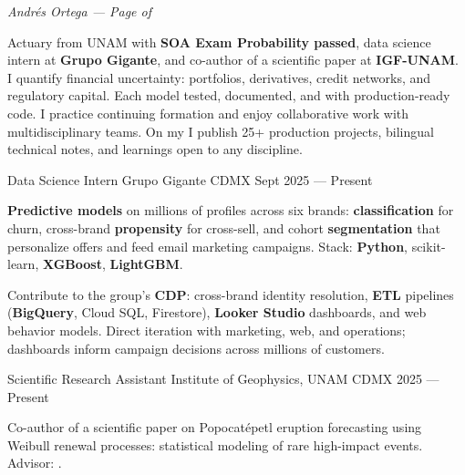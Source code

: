 \documentclass[10pt, letterpaper]{awesome-cv}
\renewcommand{\acvSectionContentTopSkip}{0.3mm}
\renewenvironment{cvparagraph}{%
  \vspace{\acvSectionContentTopSkip}%
  \vspace{-3mm}%
  \paragraphstyle%
}{%
  \par%
  \vspace{0.3mm}%
}
\renewcommand*{\paragraphstyle}{\fontsize{8.5pt}{1.15em}\bodyfontlight\upshape\color{text}}
\begin{document}
\makecvheader[C]


\makecvfooter
  {}
  {\color{lightgray}\textit{\small Andrés Ortega — Page \thepage{} of \pageref*{LastPage}}}
  {}


\begin{cvparagraph}
Actuary from UNAM with \textbf{SOA Exam Probability passed}, data science intern at \textbf{Grupo Gigante}, and co-author of a scientific paper at \textbf{IGF-UNAM}. I quantify financial uncertainty: portfolios, derivatives, credit networks, and regulatory capital. Each model tested, documented, and with production-ready code. I practice continuing formation and enjoy collaborative work with multidisciplinary teams. On my  I publish 25+ production projects, bilingual technical notes, and learnings open to any discipline.
\end{cvparagraph}


\begin{cventries}

  \cventry
    {Data Science Intern}
    {Grupo Gigante}
    {CDMX}
    {Sept 2025 — Present}
    {
      \begin{cvitems}
        \item {\textbf{Predictive models} on millions of profiles across six brands: \textbf{classification} for churn, cross-brand \textbf{propensity} for cross-sell, and cohort \textbf{segmentation} that personalize offers and feed email marketing campaigns. Stack: \textbf{Python}, scikit-learn, \textbf{XGBoost}, \textbf{LightGBM}.}
        \item {Contribute to the group's \textbf{CDP}: cross-brand identity resolution, \textbf{ETL} pipelines (\textbf{BigQuery}, Cloud SQL, Firestore), \textbf{Looker Studio} dashboards, and web behavior models. Direct iteration with marketing, web, and operations; dashboards inform campaign decisions across millions of customers.}
      \end{cvitems}
    }

  \cventry
    {Scientific Research Assistant }
    {Institute of Geophysics, UNAM}
    {CDMX}
    {2025 — Present}
    {
      \begin{cvitems}
        \item {Co-author of a scientific paper on Popocatépetl eruption forecasting using Weibull renewal processes: statistical modeling of rare high-impact events. Advisor: .}
      \end{cvitems}
    }

\end{cventries}
\end{document}
